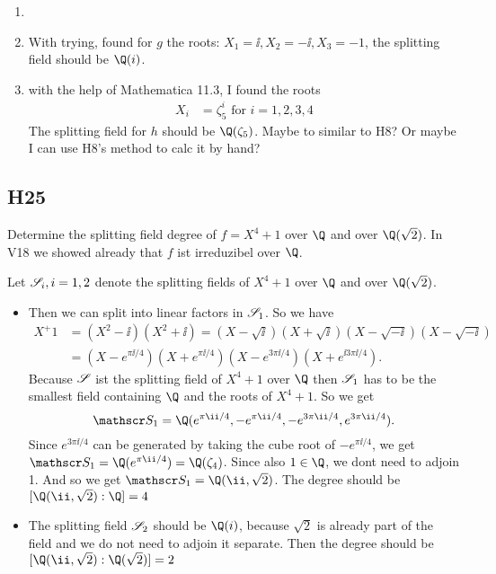 \begin{solution}
	\begin{enumerate}
		\item 
		\item With trying, found for $g$ the roots: $X_1 = \ii, X_2 = -\ii, X_3 = -1$, the splitting field should be $\Q(i)$. %
		\item with the help of Mathematica 11.3, I found the roots %
		\begin{align*}
			X_i &= \zeta_5^i \text{ for } i = 1,2,3,4
		\end{align*}
		The splitting field for $h$ should be $\Q(\zeta_5)$. %
		Maybe to similar to H8? Or maybe I can use H8's method to calc it by hand?
	\end{enumerate}
\end{solution}

\subsection{H25}
Determine the splitting field degree of $f = X^4 + 1$ over $\Q$ and over $\Q(\sqrt{2})$. In V18 we showed already that $f$ ist irreduzibel over $\Q$.
\begin{solution}
	Let $\mathscr S_i, i =1,2$ denote the splitting fields of $X^4 +1$ over $\Q$ and over $\Q(\sqrt{2})$.
	\begin{itemize}
		\item Then we can split into linear factors in $\mathscr S_1$.
		So we have
		\begin{align*}
		X^ +1 &= (X^2 -\ii)(X^2 +\ii) = (X - \sqrt{\ii})(X+ \sqrt{\ii})(X- \sqrt{-\ii})(X- \sqrt{-\ii})\\
		&= (X-e^{\pi\ii /4})(X+e^{\pi\ii /4})(X-e^{3\pi\ii/4})(X+e^{\ii 3\pi\ii/4}).
		\end{align*}
		Because $\mathscr S$ ist the splitting field of $X^4 +1$ over $\Q$ then $\mathscr S_1$ has to be the smallest field containing $\Q$ and the roots of $X^4 +1$. So we get
		\[
		\Split_1 = \Q(e^{\pi\ii /4}, -e^{\pi\ii /4}, -e^{3\pi\ii/4}, e^{3\pi\ii/4}).
		\]
		Since $e^{3\pi\ii/4}$ can be generated by taking the cube root of $-e^{\pi\ii/4}$, we get $\Split_1 = \Q(e^{\pi\ii/4}) = \Q(\zeta_4)$. Since also $1 \in \Q$, we dont need to adjoin 1. And so we get $\Split_1 = \Q(\ii, \sqrt{2})$. The degree should be $[\Q(\ii, \sqrt{2}):\Q] = 4$
		\item The splitting field $\mathscr S_2$ should be $\Q(i)$, because $\sqrt{2}$ is already part of the field and we do not need to adjoin it separate. Then the degree should be $[\Q(\ii, \sqrt{2}):\Q(\sqrt{2})] = 2$ %
	\end{itemize}
\end{solution}